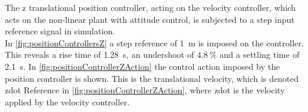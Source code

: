 \begin{minipage}{\linewidth}
\begin{minipage}{0.45\linewidth}
\begin{figure}[H]
            \centering
            \label{fig:velocityControllerZAction}
        \end{figure}
    \end{minipage}
\end{minipage}

The z translational position controller, acting on the velocity controller, which acts on the non-linear plant with attitude control, is subjected to a step input reference signal in simulation.\\
In \autoref{fig:positionControllersZ} a step reference of \SI{1}{m} is imposed on the controller. This reveals a rise time of \SI{1.28}{s}, an undershoot of  $4.8\ \%$ and a settling time of \SI{2.1}{s}. In \autoref{fig:positionControllerZAction} the control action imposed by the position controller is shown. This is the translational velocity, which is denoted zdot Reference in \autoref{fig:positionControllerZAction}, where zdot is the velocity applied by the velocity controller.

